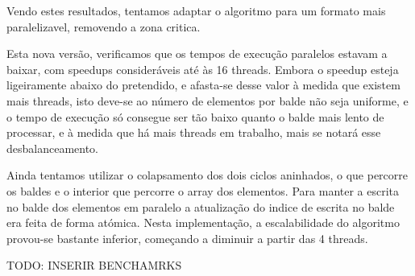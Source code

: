 \documentclass[a4paper]{report}
\begin{document}
Vendo estes resultados, tentamos adaptar o algoritmo para um formato mais
paralelizavel, removendo a zona critica.

Esta nova versão, verificamos que os tempos de execução paralelos estavam a baixar, com
speedups consideráveis até às 16 threads. Embora o speedup esteja ligeiramente
abaixo do pretendido, e afasta-se desse valor à medida que existem mais threads,
isto deve-se ao número de elementos por balde não seja uniforme, e o tempo de
execução só consegue ser tão baixo quanto o balde mais lento de processar, e à
medida que há mais threads em trabalho, mais se notará esse desbalanceamento.

Ainda tentamos utilizar o colapsamento dos dois ciclos aninhados, o que percorre
os baldes e o interior que percorre o array dos elementos. Para manter a escrita
no balde dos elementos em paralelo a atualização do indice de escrita no balde
era feita de forma atómica. Nesta implementação, a escalabilidade do algoritmo
provou-se bastante inferior, começando a diminuir a partir das 4 threads.

TODO: INSERIR BENCHAMRKS
\end{document}

